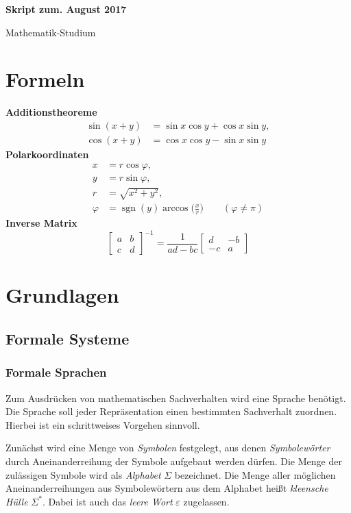 \documentclass[a4paper,11pt,fleqn,twoside]{scrartcl}
\numberwithin{equation}{section}
\newcommand{\strong}[1]{{\sf\bfseries #1}}
\newcommand{\emdef}[1]{\emph{#1}}
\begin{document}
\thispagestyle{empty}

\noindent
{\huge\sf\bfseries
Skript zum\hfill {\normalsize\rmfamily{}. August 2017}
\par\noindent
Mathematik-Studium
\par}

\tableofcontents

\newpage
\section*{Formeln}
\strong{Additionstheoreme}
\begin{align*}
\sin(x+y) &= \sin x\cos y + \cos x\sin y,\\
\cos(x+y) &= \cos x\cos y - \sin x\sin y
\end{align*}
\strong{Polarkoordinaten}
\begin{align*}
x &= r\cos\varphi,\\
y &= r\sin\varphi,\\
r &= \sqrt{x^2+y^2},\\
\varphi &= \operatorname{sgn}(y)\arccos\Big(\frac{x}{r}\Big)\qquad (\varphi\ne\pi)
\end{align*}
\strong{Inverse Matrix}
\[
\begin{bmatrix}
a & b\\
c & d
\end{bmatrix}^{-1}
= \frac{1}{ad-bc} \begin{bmatrix}
d & -b\\
-c & a
\end{bmatrix}
\]

\newpage

\section{Grundlagen}
\subsection{Formale Systeme}
\subsubsection{Formale Sprachen}
Zum Ausdrücken von mathematischen Sachverhalten wird eine Sprache
benötigt. Die Sprache soll jeder Repräsentation einen bestimmten
Sachverhalt zuordnen. Hierbei ist ein schrittweises Vorgehen
sinnvoll.

Zunächst wird eine Menge von \emdef{Symbolen} festgelegt, aus denen
\emdef{Symbolewörter} durch Aneinanderreihung der Symbole aufgebaut
werden dürfen. Die Menge der zulässigen Symbole wird als
\emdef{Alphabet} $\Sigma$ bezeichnet. Die Menge aller möglichen
Aneinanderreihungen aus Symbolewörtern aus dem Alphabet heißt
\emdef{kleensche Hülle} $\Sigma^*$. Dabei ist auch das
\emdef{leere Wort} $\varepsilon$ zugelassen.
\end{document}

